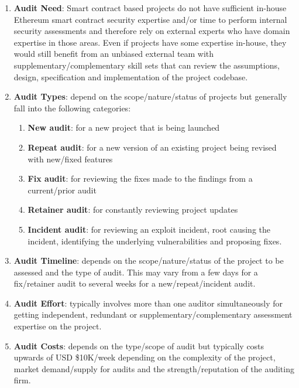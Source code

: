 \begin{enumerate}
\item\textbf{Audit Need}: Smart contract based projects do not have sufficient in-house Ethereum smart contract security expertise and/or time to perform internal security assessments and therefore rely on external experts who have domain expertise in those areas. Even if projects have some expertise in-house, they would still benefit from an unbiased external team with supplementary/complementary skill sets that can review the assumptions, design, specification and implementation of the project codebase.

\item\textbf{Audit Types}: depend on the scope/nature/status of projects but generally fall into the following categories:
	\begin{enumerate}
	\item\textbf{New audit}: for a new project that is being launched
	\item\textbf{Repeat audit}: for a new version of an existing project being revised with new/fixed features
	\item\textbf{Fix audit}: for reviewing the fixes made to the findings from a current/prior audit
	\item\textbf{Retainer audit}: for constantly reviewing project updates
	\item\textbf{Incident audit}: for reviewing an exploit incident, root causing the incident, identifying the underlying vulnerabilities and proposing fixes.
	\end{enumerate}

\item\textbf{Audit Timeline}: depends on the scope/nature/status of the project to be assessed and the type of audit. This may vary from a few days for a fix/retainer audit to several weeks for a new/repeat/incident audit.

\item\textbf{Audit Effort}: typically involves more than one auditor simultaneously for getting independent, redundant or supplementary/complementary assessment expertise on the project.

\item\textbf{Audit Costs}: depends on the type/scope of audit but typically costs upwards of USD \$10K/week depending on the complexity of the project, market demand/supply for audits and the strength/reputation of the auditing firm.


\end{enumerate}
